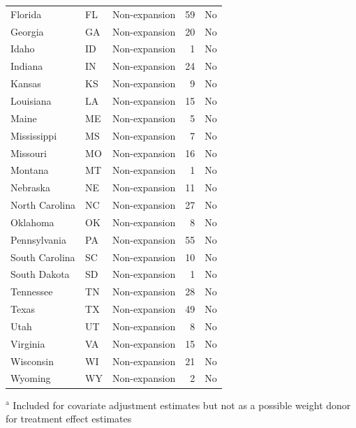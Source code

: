 \begin{table}[ht]
\begin{tabular}{lllrl}
  Florida & FL & Non-expansion &  59 & No \\ 
  Georgia & GA & Non-expansion &  20 & No \\ 
  Idaho & ID & Non-expansion &   1 & No \\ 
  Indiana & IN & Non-expansion &  24 & No \\ 
  Kansas & KS & Non-expansion &   9 & No \\ 
  Louisiana & LA & Non-expansion &  15 & No \\ 
  Maine & ME & Non-expansion &   5 & No \\ 
  Mississippi & MS & Non-expansion &   7 & No \\ 
  Missouri & MO & Non-expansion &  16 & No \\ 
  Montana & MT & Non-expansion &   1 & No \\ 
  Nebraska & NE & Non-expansion &  11 & No \\ 
  North Carolina & NC & Non-expansion &  27 & No \\ 
  Oklahoma & OK & Non-expansion &   8 & No \\ 
  Pennsylvania & PA & Non-expansion &  55 & No \\ 
  South Carolina & SC & Non-expansion &  10 & No \\ 
  South Dakota & SD & Non-expansion &   1 & No \\ 
  Tennessee & TN & Non-expansion &  28 & No \\ 
  Texas & TX & Non-expansion &  49 & No \\ 
  Utah & UT & Non-expansion &   8 & No \\ 
  Virginia & VA & Non-expansion &  15 & No \\ 
  Wisconsin & WI & Non-expansion &  21 & No \\ 
  Wyoming & WY & Non-expansion &   2 & No \\ 
   \hline
\end{tabular}
     \vspace{1ex}
     
     {\raggedright $^\textrm{a}$ Included for covariate adjustment estimates but not as a possible weight donor for treatment effect estimates \par }
\end{table}

